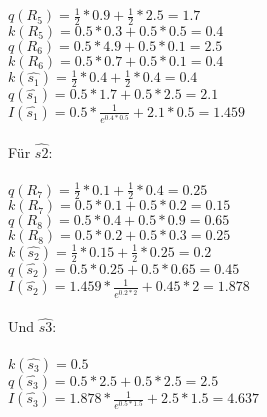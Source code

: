 \\
$q(R_5) = \frac{1}{2} * 0.9 + \frac{1}{2} * 2.5 = 1.7$\\
$k(R_5) = 0.5 * 0.3 + 0.5 * 0.5 = 0.4$\\
$q(R_6) = 0.5 * 4.9 + 0.5 * 0.1 = 2.5$\\
$k(R_6) = 0.5 * 0.7 + 0.5 * 0.1 = 0.4$\\
$k(\hat{s_1}) = \frac{1}{2} * 0.4 + \frac{1}{2} * 0.4 = 0.4$\\
$q(\hat{s_1}) = 0.5 * 1.7 + 0.5 * 2.5 = 2.1$\\
$I(\hat{s_1}) = 0.5 * \frac{1}{e^{0.4*0.5}} + 2.1 * 0.5 = 1.459$\\
\\
Für $\hat{s2}$:\\
\\
$q(R_7) = \frac{1}{2} * 0.1 + \frac{1}{2} * 0.4 = 0.25$\\
$k(R_7) = 0.5 * 0.1 + 0.5 * 0.2 = 0.15$\\
$q(R_8) = 0.5 * 0.4 + 0.5 * 0.9 = 0.65$\\
$k(R_8) = 0.5 * 0.2 + 0.5 * 0.3 = 0.25$\\
$k(\hat{s_2}) = \frac{1}{2} * 0.15 + \frac{1}{2} * 0.25 = 0.2$\\
$q(\hat{s_2}) = 0.5 * 0.25 + 0.5 * 0.65 = 0.45$\\
$I(\hat{s_2}) = 1.459 * \frac{1}{e^{0.2 * 2}} + 0.45 * 2 = 1.878$\\
\\
Und $\hat{s3}$:\\
\\
$k(\hat{s_3}) = 0.5$\\
$q(\hat{s_3}) = 0.5 * 2.5 + 0.5 * 2.5 = 2.5$\\
$I(\hat{s_3}) = 1.878 * \frac{1}{e^{0.5*1.5}} + 2.5 * 1.5 = 4.637$\\
